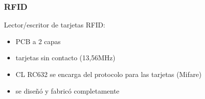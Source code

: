 \documentclass{beamer}
\begin{document}
\begin{frame}
	\frametitle{RFID}
	Lector/escritor de tarjetas RFID:
	\begin{figure}
	\end{figure}

\begin{itemize}
\item PCB a 2 capas
\item tarjetas sin contacto (13,56MHz)
\item CL RC632 se encarga del protocolo para las tarjetas (Mifare)
\item se diseñó y fabricó completamente
\end{itemize}
\end{frame}
\end{document}
